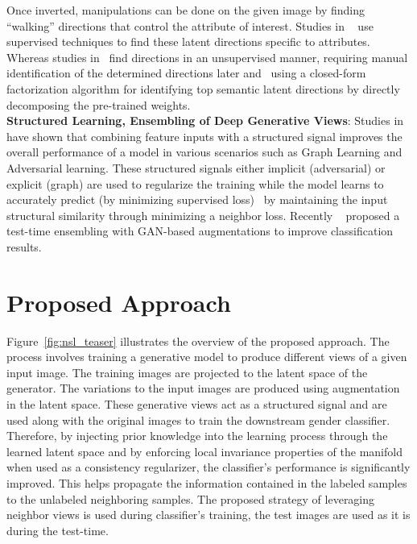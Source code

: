 \documentclass[runningheads]{llncs}
\begin{document}
Once inverted, manipulations can be done on the given image by finding “walking” directions that control the attribute of interest. Studies in ~\cite{walking1,ganalyze,walking_bias} use supervised techniques to find these latent directions specific to attributes. Whereas studies in~\cite{editing2,walking_un1,walking_un2} find directions in an unsupervised manner, requiring manual identification of the determined directions later and~\cite{sefa} using a closed-form factorization algorithm for identifying top semantic latent directions by directly decomposing the pre-trained weights. \\

\noindent \textbf{Structured Learning, Ensembling of Deep Generative Views}: 
Studies in~\cite{neural_graph_learning,ssl_gcn,goodfellow_adverarial,miyato} have shown that combining feature inputs with a structured signal improves the overall performance of a model in various scenarios such as Graph Learning and Adversarial learning. These structured signals either implicit (adversarial) or explicit (graph) are used to regularize the training while the model learns to accurately predict (by minimizing supervised loss)~\cite{nsl} by maintaining the input structural similarity through minimizing a neighbor loss. Recently ~\cite{ensembling_views} proposed a test-time ensembling with GAN-based augmentations to improve classification results. 



\section{Proposed Approach}
Figure~\ref{fig:nsl_teaser} illustrates the overview of the proposed approach. The process involves training a generative model to produce different views of a given input image. The training images are projected to the latent space of the generator. The variations to the input images are produced using augmentation in the latent space. These generative views act as a structured signal and are used along with the original images to train the downstream gender classifier. Therefore, by injecting prior knowledge into the learning process through the learned latent space and by enforcing local invariance properties of the manifold when used as a consistency regularizer, the classifier's performance is significantly improved. This helps propagate the information contained in the labeled samples to the unlabeled neighboring samples. The proposed strategy of leveraging neighbor views is used during classifier's training, the test images are used as it is during the test-time. 
\end{document}
